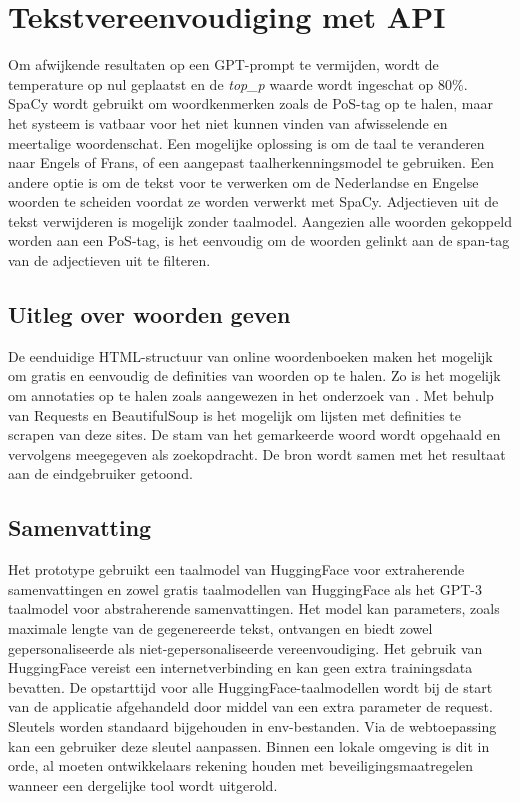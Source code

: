 \section{Tekstvereenvoudiging met API}


Om afwijkende resultaten op een GPT-prompt te vermijden, wordt de temperature op nul geplaatst en de \textit{top\_p} waarde wordt ingeschat op 80\%. SpaCy wordt gebruikt om woordkenmerken zoals de PoS-tag op te halen, maar het systeem is vatbaar voor het niet kunnen vinden van afwisselende en meertalige woordenschat. Een mogelijke oplossing is om de taal te veranderen naar Engels of Frans, of een aangepast taalherkenningsmodel te gebruiken. Een andere optie is om de tekst voor te verwerken om de Nederlandse en Engelse woorden te scheiden voordat ze worden verwerkt met SpaCy. Adjectieven uit de tekst verwijderen is mogelijk zonder taalmodel. Aangezien alle woorden gekoppeld worden aan een PoS-tag, is het eenvoudig om de woorden gelinkt aan de span-tag van de adjectieven uit te filteren.

\subsection{Uitleg over woorden geven}

De eenduidige HTML-structuur van online woordenboeken maken het mogelijk om gratis en eenvoudig de definities van woorden op te halen. Zo is het mogelijk om annotaties op te halen zoals aangewezen in het onderzoek van \textcite{Bulté2018}. Met behulp van Requests en BeautifulSoup is het mogelijk om lijsten met definities te scrapen van deze sites. De stam van het gemarkeerde woord wordt opgehaald en vervolgens meegegeven als zoekopdracht. De bron wordt samen met het resultaat aan de eindgebruiker getoond. 

\subsection{Samenvatting}

Het prototype gebruikt een taalmodel van HuggingFace voor extraherende samenvattingen en zowel gratis taalmodellen van HuggingFace als het GPT-3 taalmodel voor abstraherende samenvattingen. Het model kan parameters, zoals maximale lengte van de gegenereerde tekst, ontvangen en biedt zowel gepersonaliseerde als niet-gepersonaliseerde vereenvoudiging. Het gebruik van HuggingFace vereist een internetverbinding en kan geen extra trainingsdata bevatten. De opstarttijd voor alle HuggingFace-taalmodellen wordt bij de start van de applicatie afgehandeld door middel van een extra parameter de request. Sleutels worden standaard bijgehouden in env-bestanden. Via de webtoepassing kan een gebruiker deze sleutel aanpassen. Binnen een lokale omgeving is dit in orde, al moeten ontwikkelaars rekening houden met beveiligingsmaatregelen wanneer een dergelijke tool wordt uitgerold.

